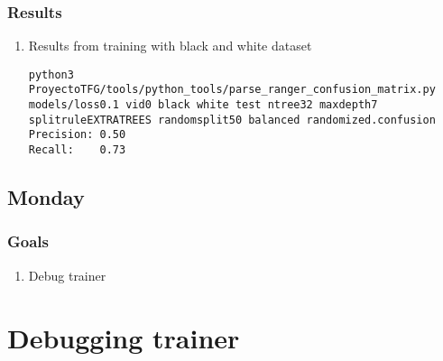 \documentclass[12pt,oneside]{book}
\begin{document}
\subsubsection{Results}
\begin{enumerate}
  \item Results from training with black and white dataset
\begin{lstlisting}
python3 ProyectoTFG/tools/python_tools/parse_ranger_confusion_matrix.py models/loss0.1 vid0 black white test ntree32 maxdepth7 splitruleEXTRATREES randomsplit50 balanced randomized.confusion 
Precision: 0.50
Recall:    0.73
\end{lstlisting}
\end{enumerate}

\subsection*{Monday}

\subsubsection{Goals}
\begin{enumerate}
  \item Debug trainer
\end{enumerate}

\section{Debugging trainer}
\end{document}

